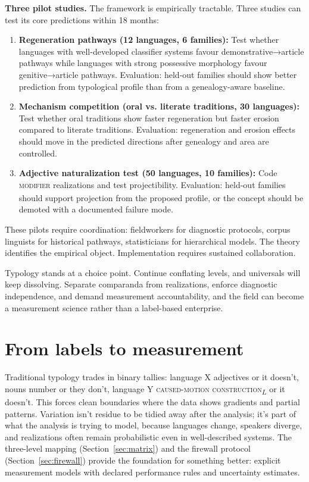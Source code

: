 \documentclass[12pt]{article}
\begin{document}
\textbf{Three pilot studies.} The framework is empirically tractable. Three studies can test its core predictions within 18 months:

\begin{enumerate}
\item \textbf{Regeneration pathways (12 languages, 6 families):} Test whether languages with well-developed classifier systems favour demonstrative→article pathways while languages with strong possessive morphology favour genitive→article pathways. Evaluation: held-out families should show better prediction from typological profile than from a genealogy-aware baseline.

\item \textbf{Mechanism competition (oral vs. literate traditions, 30 languages):} Test whether oral traditions show faster regeneration but faster erosion compared to literate traditions. Evaluation: regeneration and erosion effects should move in the predicted directions after genealogy and area are controlled.

\item \textbf{Adjective naturalization test (50 languages, 10 families):} Code \textsc{modifier}\textsubscript{\Cross} realizations and test projectibility. Evaluation: held-out families should support projection from the proposed profile, or the concept should be demoted with a documented failure mode.
\end{enumerate}

These pilots require coordination: fieldworkers for diagnostic protocols, corpus linguists for historical pathways, statisticians for hierarchical models. The theory identifies the empirical object. Implementation requires sustained collaboration.

Typology stands at a choice point. Continue conflating levels, and universals will keep dissolving. Separate comparanda from realizations, enforce diagnostic independence, and demand measurement accountability, and the field can become a measurement science rather than a label-based enterprise.

\clearpage

\appendix

\section{From labels to measurement}\label{sec:measurement}
Traditional typology trades in binary tallies: language X  adjectives or it doesn't, nouns  number or they don't, language Y  \textsc{caused-motion construction}\textsubscript{$L$} or it doesn't. This forces clean boundaries where the data shows gradients and partial patterns. Variation isn't residue to be tidied away after the analysis; it's part of what the analysis is trying to model, because languages change, speakers diverge, and realizations often remain probabilistic even in well-described systems. The three-level mapping (Section~\ref{sec:matrix}) and the firewall protocol (Section~\ref{sec:firewall}) provide the foundation for something better: explicit measurement models with declared performance rules and uncertainty estimates.
\end{document}
